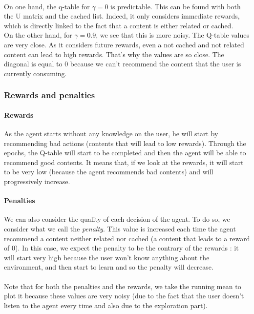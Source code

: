 \documentclass[a4paper]{article}
\begin{document}
	\paragraph{} On one hand, the q-table for $\gamma = 0 $ is predictable. This can be found with both the U matrix and the cached list. Indeed, it only considers immediate rewards, which is directly linked to the fact that a content is either related or cached.  \\
	On the other hand, for $\gamma = 0.9$, we see that this is more noisy. The Q-table values are very close. As it considers future rewards, even a not cached and not related content can lead to high rewards. That's why the values are so close. The diagonal is equal to 0 because we can't recommend the content that the user is currently consuming.\\
	 
	 \newpage
	 
	 
	 
	\subsubsection{Rewards and penalties}
	\paragraph{Rewards} As the agent starts without any knowledge on the user, he will start by recommending bad actions (contents that will lead to low rewards). Through the epochs, the Q-table will start to be completed and then the agent will be able to recommend good contents. It means that, if we look at the rewards, it will start to be very low (because the agent recommends bad contents) and will progressively increase. 
	
	\paragraph{Penalties} We can also consider the quality of each decision of the agent. To do so, we consider what we call the \textit{penalty}. This value is increased each time the agent recommend a content neither related nor cached (a content that leads to a reward of 0). In this case, we expect the penalty to be the contrary of the rewards : it will start very high because the user won't know anything about the environment, and then start to learn and so the penalty will decrease. 
	\paragraph{}	Note that for both the penalties and the rewards, we take the running mean to plot it because these values are very noisy (due to the fact that the user doesn't listen to the agent every time and also due to the exploration part).
	
\end{document}
